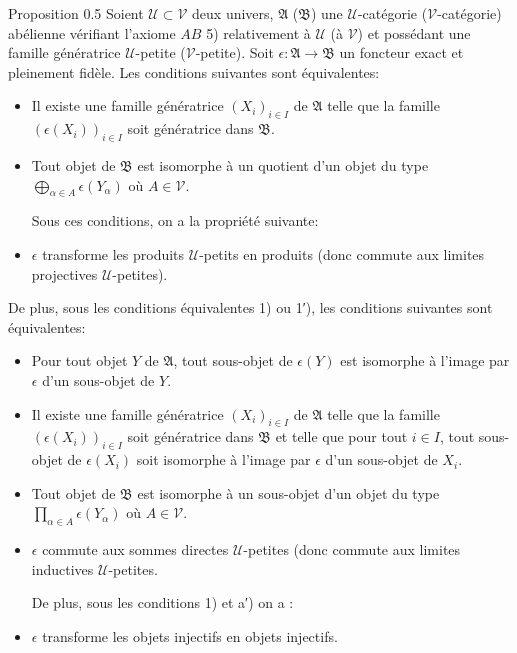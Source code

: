 \documentclass[10pt]{../fichiers-configuration-latex/smfart}
\begin{document}
\begin{enonce*}{Proposition 0.5}
Soient $𝒰 \subset 𝒱$ deux univers, $\mathfrak{A}$
(\resp $\mathfrak{B}$) une $𝒰$-catégorie (\resp $𝒱$-catégorie)
abélienne vérifiant l'axiome $AB$ 5) relativement à $𝒰$
(\resp à $𝒱$) et possédant une famille génératrice $𝒰$-petite
(\resp $𝒱$-petite). Soit $\epsilon : \mathfrak{A} \to \mathfrak{B}$
un foncteur exact et pleinement fidèle. Les conditions suivantes
sont équivalentes:
\begin{itemize}
\item[1)] Il existe une famille génératrice $(X_i)_{i\in I}$ de
  $\mathfrak{A}$ telle que la famille $(\epsilon(X_i))_{i\in I}$
  soit génératrice dans $\mathfrak{B}$.

\item[1′)] Tout objet de $\mathfrak{B}$ est isomorphe à un quotient
  d'un objet du type $\displaystyle{⨁_{\alpha \in A}} \epsilon
  (Y_\alpha)$ où $A \in 𝒱$.

   Sous ces conditions, on a la propriété suivante:

\item [2)] $\epsilon$ transforme les produits $𝒰$-petits en
  produits (donc commute aux limites projectives $𝒰$-petites).
\end{itemize}

De plus, sous les conditions équivalentes 1) ou 1′), les conditions
suivantes sont équivalentes\pageoriginale:
\begin{itemize}
\item[a)] Pour tout objet $Y$ de $\mathfrak{A}$, tout sous-objet de
  $\epsilon(Y)$ est isomorphe à l'image par $\epsilon$ d'un
  sous-objet de $Y$.

\item[a′)] Il existe une famille génératrice $(X_i)_{i \in I}$ de
  $\mathfrak{A}$ telle que la famille $(\epsilon(X_i))_{i \in I}$
  soit génératrice dans $\mathfrak{B}$ et telle que pour tout $i
  \in I$, tout sous-objet de $\epsilon(X_i)$ soit isomorphe à
  l'image par $\epsilon$ d'un sous-objet de $X_i$.

\item[b)] Tout objet de $\mathfrak{B}$ est isomorphe à un sous-objet d'un
  objet du type $\prod_{\alpha \in A} \epsilon(Y_\alpha)$ où
  $A \in 𝒱$.

\item[c)] $\epsilon$ commute aux sommes directes $𝒰$-petites (donc
  commute aux limites inductives $𝒰$-petites.

De plus, sous les conditions 1) et a′) on a :

\item[d)] $\epsilon$ transforme les objets injectifs en objets injectifs.
\end{itemize}
\end{enonce*}
\end{document}
